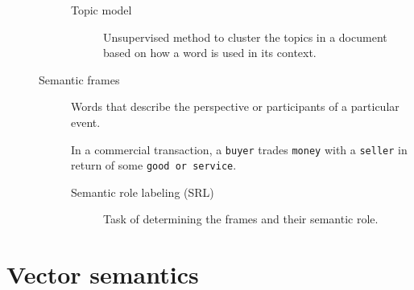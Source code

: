 \begin{description}
\begin{description}
                \begin{description}
                    \item[Topic model] 
                        Unsupervised method to cluster the topics in a document based on how a word is used in its context.
                \end{description}

            \item[Semantic frames] 
                Words that describe the perspective or participants of a particular event.

                \begin{example}
                    In a commercial transaction, a \texttt{buyer} trades \texttt{money} with a \texttt{seller} in return of some \texttt{good or service}.
                \end{example}

                \begin{description}
                    \item[Semantic role labeling (SRL)] 
                        Task of determining the frames and their semantic role.
                \end{description}
        \end{description}
\end{description}


\section{Vector semantics}

